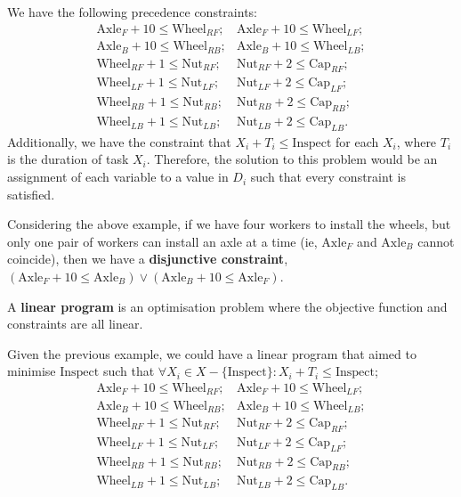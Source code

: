 \begin{example}
    We have the following precedence constraints:\\
    \begin{align*}
        \text{Axle}_{F} + 10 \le \text{Wheel}_{RF}; & \text{Axle}_{F} + 10 \le \text{Wheel}_{LF};\\
        \text{Axle}_{B} + 10 \le \text{Wheel}_{RB}; & \text{Axle}_{B} + 10 \le \text{Wheel}_{LB};\\
        \text{Wheel}_{RF} + 1 \le \text{Nut}_{RF}; & \text{Nut}_{RF} + 2 \le \text{Cap}_{RF};\\
        \text{Wheel}_{LF} + 1 \le \text{Nut}_{LF}; & \text{Nut}_{LF} + 2 \le \text{Cap}_{LF};\\
        \text{Wheel}_{RB} + 1 \le \text{Nut}_{RB}; & \text{Nut}_{RB} + 2 \le \text{Cap}_{RB};\\
        \text{Wheel}_{LB} + 1 \le \text{Nut}_{LB}; & \text{Nut}_{LB} + 2 \le \text{Cap}_{LB}.
    \end{align*}
    Additionally, we have the constraint that $X_{i} + T_{i} \le \text{Inspect}$ for each $X_{i}$, where $T_{i}$ is the duration of task $X_{i}$. Therefore, the solution to this problem would be an assignment of each variable to a value in $D_{i}$ such that every constraint is satisfied.
\end{example}

Considering the above example, if we have four workers to install the wheels, but only one pair of workers can install an axle at a time (ie, $\text{Axle}_{F}$ and $\text{Axle}_{B}$ cannot coincide), then we have a \textbf{disjunctive constraint}, $(\text{Axle}_{F} + 10 \le \text{Axle}_{B}) \lor (\text{Axle}_{B} + 10 \le \text{Axle}_{F})$.

\begin{definition}
    A \textbf{linear program} is an optimisation problem where the objective function and constraints are all linear.
\end{definition}

\begin{example}
    Given the previous example, we could have a linear program that aimed to minimise $\text{Inspect}$ such that $\forall X_{i} \in X - \{ \text{Inspect} \} : X_{i} + T_{i} \le \text{Inspect}$;
    \begin{align*}
        \text{Axle}_{F} + 10 \le \text{Wheel}_{RF}; & \text{Axle}_{F} + 10 \le \text{Wheel}_{LF};\\
        \text{Axle}_{B} + 10 \le \text{Wheel}_{RB}; & \text{Axle}_{B} + 10 \le \text{Wheel}_{LB};\\
        \text{Wheel}_{RF} + 1 \le \text{Nut}_{RF}; & \text{Nut}_{RF} + 2 \le \text{Cap}_{RF};\\
        \text{Wheel}_{LF} + 1 \le \text{Nut}_{LF}; & \text{Nut}_{LF} + 2 \le \text{Cap}_{LF};\\
        \text{Wheel}_{RB} + 1 \le \text{Nut}_{RB}; & \text{Nut}_{RB} + 2 \le \text{Cap}_{RB};\\
        \text{Wheel}_{LB} + 1 \le \text{Nut}_{LB}; & \text{Nut}_{LB} + 2 \le \text{Cap}_{LB}.
    \end{align*}
\end{example}

